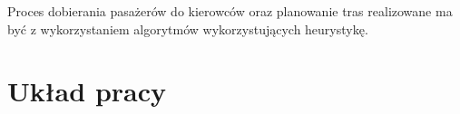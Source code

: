 Proces dobierania pasażerów do kierowców oraz planowanie tras realizowane ma być z wykorzystaniem algorytmów wykorzystujących heurystykę.  


\section{Układ pracy}
